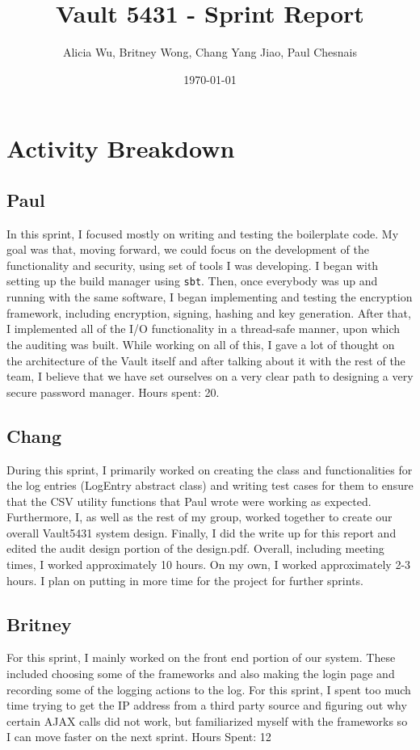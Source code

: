\documentclass{article}
\title{Vault 5431 - Sprint Report}
\author{Alicia Wu, Britney Wong, Chang Yang Jiao, Paul Chesnais}
\date{\today}
\begin{document}
\maketitle
\thispagestyle{empty}

\section{Activity Breakdown}
\subsection{Paul}
\par In this sprint, I focused mostly on writing and testing the boilerplate code. My goal was that, moving forward, we could focus on the development of the functionality and security, using set of tools I was developing. I began with setting up the build manager using \texttt{sbt}. Then, once everybody was up and running with the same software, I began implementing and testing the encryption framework, including encryption, signing, hashing and key generation. After that, I implemented all of the I/O functionality in a thread-safe manner, upon which the auditing was built. While working on all of this, I gave a lot of thought on the architecture of the Vault itself and after talking about it with the rest of the team, I believe that we have set ourselves on a very clear path to designing a very secure password manager. Hours spent: 20.

\subsection{Chang}
\par During this sprint, I primarily worked on creating the class and functionalities for the log entries (LogEntry abstract class) and writing test cases for them to ensure that the CSV utility functions that Paul wrote were working as expected. Furthermore, I, as well as the rest of my group, worked together to create our overall Vault5431 system design. Finally, I did the write up for this report and edited the audit design portion of the design.pdf. Overall, including meeting times, I worked approximately 10 hours. On my own, I worked approximately 2-3 hours. I plan on putting in more time for the project for further sprints.
\subsection{Britney}
\par For this sprint, I mainly worked on the front end portion of our system. These included choosing some of the frameworks and also making the login page and recording some of the logging actions to the log. For this sprint, I spent too much time trying to get the IP address from a third party source and figuring out why certain AJAX calls did not work, but familiarized myself with the frameworks so I can move faster on the next sprint. Hours Spent: 12
\end{document}
